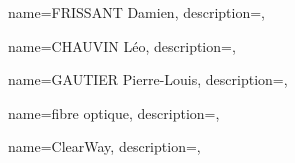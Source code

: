 {
    name={FRISSANT Damien},
    description={},
}

{
    name={CHAUVIN Léo},
    description={},
}

{
    name={GAUTIER Pierre-Louis},
    description={},
}

{
    name={fibre optique},
    description={},
}

{
    name={ClearWay},
    description={},
}
